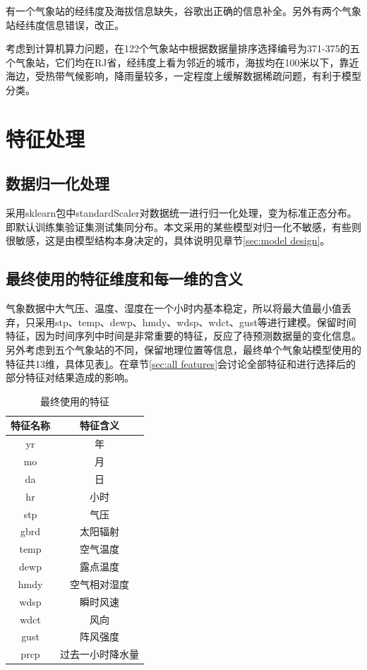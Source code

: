 \documentclass[UTF8]{ctexart}
\begin{document}
有一个气象站的经纬度及海拔信息缺失，谷歌出正确的信息补全。另外有两个气象站经纬度信息错误，改正。

考虑到计算机算力问题，在122个气象站中根据数据量排序选择编号为371-375的五个气象站，它们均在RJ省，经纬度上看为邻近的城市，海拔均在100米以下，靠近海边，受热带气候影响，降雨量较多，一定程度上缓解数据稀疏问题，有利于模型分类。

\section{特征处理}
\subsection{数据归一化处理}
采用sklearn包中standardScaler对数据统一进行归一化处理，变为标准正态分布。即默认训练集验证集测试集同分布。本文采用的某些模型对归一化不敏感，有些则很敏感，这是由模型结构本身决定的，具体说明见章节\ref{sec:model design}。

\subsection{最终使用的特征维度和每一维的含义}
\label{feature_subset}
气象数据中大气压、温度、湿度在一个小时内基本稳定，所以将最大值最小值丢弃，只采用stp、temp、dewp、hmdy、wdsp、wdct、gust等进行建模。保留时间特征，因为时间序列中时间是非常重要的特征，反应了待预测数据量的变化信息。另外考虑到五个气象站的不同，保留地理位置等信息，最终单个气象站模型使用的特征共13维，具体见表\ref{tab:feature}。在章节\ref{sec:all features}会讨论全部特征和进行选择后的部分特征对结果造成的影响。

\begin{table}[htb]
  \centering
  \begin{minipage}[t]{0.4\linewidth}
  \caption{最终使用的特征}{}
  \label{tab:feature}
    \begin{tabular}{cc}
      \toprule[1.5pt]
      特征名称& {特征含义} \\
      \midrule[1pt]
      {yr} & 年 \\
      {mo} & 月  \\
      {da} & 日 \\
      {hr} & 小时  \\
      {stp} & 气压 \\
      {gbrd} & 太阳辐射 \\
      {temp} & 空气温度 \\
      {dewp} & 露点温度 \\
      {hmdy} & 空气相对湿度 \\
      {wdsp} & 瞬时风速 \\
      {wdct} & 风向 \\
      {gust} & 阵风强度 \\
      {prcp} & 过去一小时降水量 \\
      \bottomrule[1.5pt]
    \end{tabular}
  \end{minipage}
\end{table}
\end{document}
